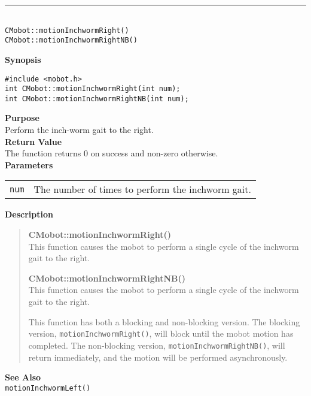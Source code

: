 \noindent
\vspace{5pt}
\rule{4.5in}{0.015in}\\
\noindent
{\LARGE \texttt{CMobot::motionInchwormRight()}}\\
{\LARGE \texttt{CMobot::motionInchwormRightNB()}}\\
{}

\noindent
{\bf Synopsis}
\vspace{-8pt}
\begin{verbatim}
#include <mobot.h>
int CMobot::motionInchwormRight(int num);
int CMobot::motionInchwormRightNB(int num);
\end{verbatim}

\noindent
{\bf Purpose}\\
Perform the inch-worm gait to the right.\\

\noindent
{\bf Return Value}\\
The function returns 0 on success and non-zero otherwise.\\

\noindent
{\bf Parameters}\\
\vspace{-0.1in}
\begin{description}
\item               
\begin{tabular}{p{15 mm}p{145 mm}}
\texttt{num} & The number of times to perform the inchworm gait.\\
\end{tabular}
\end{description}

\noindent
{\bf Description}\\
\vspace{-12pt}
\begin{quote}
{\bf CMobot::motionInchwormRight()}\\
This function causes the mobot to perform a single cycle of the inchworm gait
to the right. 

{\bf CMobot::motionInchwormRightNB()}\\
This function causes the mobot to perform a single cycle of the inchworm gait
to the right. 

This function has both a blocking and non-blocking version.
The blocking version, \texttt{motionInchwormRight()}, will block until the
mobot motion has completed. The non-blocking version, \texttt{motionInchwormRightNB()},
will return immediately, and the motion will be performed asynchronously.\\
\end{quote}

\noindent
{\bf See Also}\\
\texttt{motionInchwormLeft()}

